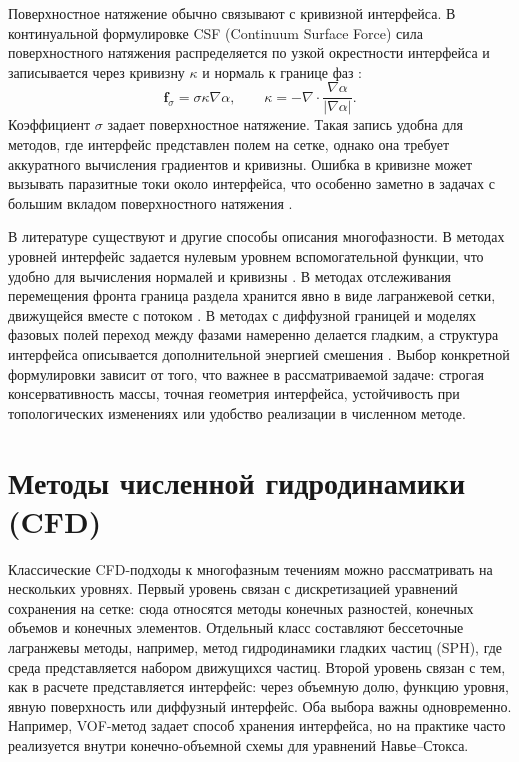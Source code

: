 Поверхностное натяжение обычно связывают с кривизной интерфейса. В
континуальной формулировке CSF (Continuum Surface Force) сила поверхностного
натяжения распределяется по узкой окрестности интерфейса и записывается через
кривизну \(\kappa\) и нормаль к границе фаз \cite{Brackbill1992}:
\begin{equation}
    \mathbf{f}_{\sigma}
    =
    \sigma\kappa\nabla\alpha,
    \qquad
    \kappa=-\nabla\cdot
    \frac{\nabla\alpha}{|\nabla\alpha|}.
    \label{eq:review_csf}
\end{equation}
Коэффициент \(\sigma\) задает поверхностное натяжение. Такая запись удобна для
методов, где интерфейс представлен полем на сетке, однако она требует
аккуратного вычисления градиентов и кривизны. Ошибка в кривизне может вызывать
паразитные токи около интерфейса, что особенно заметно в задачах с большим
вкладом поверхностного натяжения \cite{Popinet2018}.

В литературе существуют и другие способы описания многофазности. В
методах уровней интерфейс задается нулевым уровнем вспомогательной функции,
что удобно для вычисления нормалей и кривизны \cite{Osher1988}. В
методах отслеживания перемещения фронта граница раздела хранится явно в виде лагранжевой сетки,
движущейся вместе с потоком \cite{Tryggvason2001}. В методах с диффузной границей и
моделях фазовых полей переход между фазами намеренно делается гладким, а
структура интерфейса описывается дополнительной энергией смешения
\cite{Anderson1998}. Выбор конкретной формулировки зависит от того, что важнее
в рассматриваемой задаче: строгая консервативность массы, точная геометрия
интерфейса, устойчивость при топологических изменениях или удобство реализации
в численном методе.

\section{Методы численной гидродинамики (CFD)}

Классические CFD-подходы к многофазным течениям можно рассматривать на
нескольких уровнях. Первый уровень связан с дискретизацией уравнений сохранения
на сетке: сюда относятся методы конечных разностей, конечных объемов и конечных
элементов. Отдельный класс составляют бессеточные лагранжевы методы, например, метод гидродинамики гладких частиц (SPH), где среда представляется набором движущихся частиц. Второй уровень связан
с тем, как в расчете представляется интерфейс: через объемную долю,
функцию уровня, явную поверхность или диффузный интерфейс. Оба выбора важны
одновременно. Например, VOF-метод задает способ хранения интерфейса, но на
практике часто реализуется внутри конечно-объемной схемы для уравнений
Навье--Стокса.

